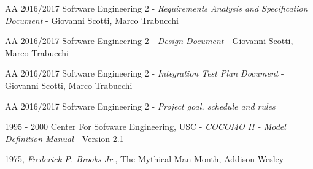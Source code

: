 \begin{thebibliography}{9}

	AA 2016/2017 Software Engineering 2 - \emph{Requirements Analysis and Specification Document} - Giovanni Scotti, Marco Trabucchi

	AA 2016/2017 Software Engineering 2 - \emph{Design Document} - Giovanni Scotti, Marco Trabucchi

	AA 2016/2017 Software Engineering 2 - \emph{Integration Test Plan Document} - Giovanni Scotti, Marco Trabucchi
	
	AA 2016/2017 Software Engineering 2 - \emph{Project goal, schedule and rules}
	
	1995 - 2000 Center For Software Engineering, USC - \emph{COCOMO II - Model Definition Manual} - Version 2.1
	
	1975, \textit{Frederick P. Brooks Jr.}, The Mythical Man-Month, Addison-Wesley

\end{thebibliography}